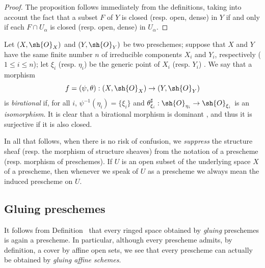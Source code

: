 \begin{proof}
The proposition follows immediately from the definitions, taking into account the fact that a subset $F$ of $Y$ is closed (resp. open, dense) in $Y$ if and only if each $F\cap U_\alpha$ is closed (resp. open, dense) in $U_\alpha$.
\end{proof}

\begin{env}[2.2.9]
\label{I.2.2.9}
Let $(X,\sh{O}_X)$ and $(Y,\sh{O}_Y)$ be two preschemes;
suppose that $X$ and $Y$ have the same finite number $n$ of irreducible components $X_i$ and $Y_i$, respectively ($1\leq i\leq n$);
let $\xi_i$ (resp. $\eta_i$) be the generic point of $X_i$ (resp. $Y_i$) .
We say that a morphism
\[
  f=(\psi,\theta):(X,\sh{O}_X)\to(Y,\sh{O}_Y)
\]
is \emph{birational} if, for all $i$, $\psi^{-1}(\eta_i)=\{\xi_i\}$ and $\theta_{\xi_i}^\sharp:\sh{O}_{\eta_i}\to\sh{O}_{\xi_i}$ is an \emph{isomorphism}.
It is clear that a birational morphism is dominant , and thus it is surjective if it is also closed.
\end{env}

\begin{notation}[2.2.10]
\label{I.2.2.10}
In all that follows, when there is no risk of confusion, we \emph{suppress} the structure sheaf (resp. the morphism of structure sheaves) from the notation of a prescheme (resp. morphism of preschemes).
If $U$ is an open subset of the underlying space $X$ of a prescheme, then whenever we speak of $U$ as a prescheme we always mean the induced prescheme on $U$.
\end{notation}

\subsection{Gluing preschemes}
\label{subsection:I.2.3}

\begin{env}[2.3.1]
\label{I.2.3.1}
It follows from Definition~ that every ringed space obtained by \emph{gluing} preschemes  is again a prescheme.
In particular, although every prescheme admits, by definition, a cover by affine open sets, we see that every prescheme can actually be obtained by \emph{gluing affine schemes}.
\end{env}

